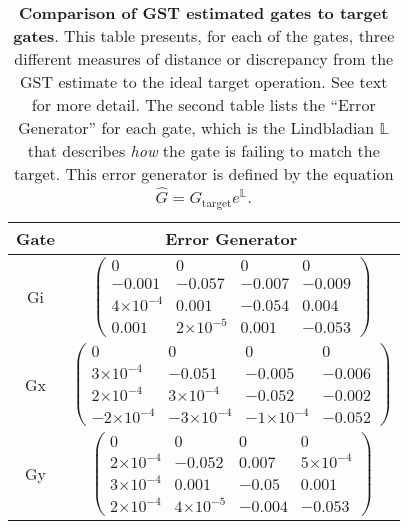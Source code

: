 \documentclass{article}[11pt]
\providecommand{\e}[1]{\ensuremath{\times 10^{#1}}}
\begin{document}
\begin{table}[h]
\begin{center}
\vspace{2em}
\begin{tabular}[l]{|c|c|}
\hline
Gate & Error Generator \\ \hline
Gi & $ \left(\!\!\begin{array}{cccc}
0 & 0 & 0 & 0 \\ 
-0.001 & -0.057 & -0.007 & -0.009 \\ 
4\e{-4} & 0.001 & -0.054 & 0.004 \\ 
0.001 & 2\e{-5} & 0.001 & -0.053
 \end{array}\!\!\right) $
 \\ \hline
Gx & $ \left(\!\!\begin{array}{cccc}
0 & 0 & 0 & 0 \\ 
3\e{-4} & -0.051 & -0.005 & -0.006 \\ 
2\e{-4} & 3\e{-4} & -0.052 & -0.002 \\ 
-2\e{-4} & -3\e{-4} & -1\e{-4} & -0.052
 \end{array}\!\!\right) $
 \\ \hline
Gy & $ \left(\!\!\begin{array}{cccc}
0 & 0 & 0 & 0 \\ 
2\e{-4} & -0.052 & 0.007 & 5\e{-4} \\ 
3\e{-4} & 0.001 & -0.05 & 0.001 \\ 
2\e{-4} & 4\e{-5} & -0.004 & -0.053
 \end{array}\!\!\right) $
 \\ \hline
\end{tabular}

\caption{\textbf{Comparison of GST estimated gates to target gates}.  This table presents, for each of the gates, three different measures of distance or discrepancy from the GST estimate to the ideal target operation.  See text for more detail.  The second table lists the ``Error Generator'' for each gate, which is the Lindbladian $\mathbb{L}$ that describes \emph{how} the gate is failing to match the target.  This error generator is defined by the equation $\hat{G} = G_{\mathrm{target}}e^{\mathbb{L}}$. \label{bestGatesetVsTargetTable}}
\end{center}
\end{table}
\end{document}
